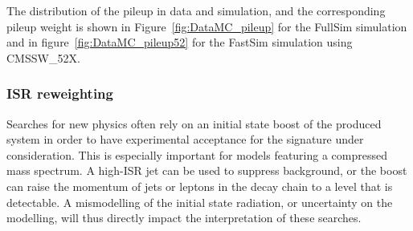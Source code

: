 The distribution of the pileup in data and simulation, and the corresponding pileup weight is
shown
in Figure~\ref{fig:DataMC_pileup} for the FullSim simulation and in
figure~\ref{fig:DataMC_pileup52}
for the FastSim simulation using CMSSW\_52X. 
% 
% 
% 
% 
% 


\subsubsection{ISR reweighting \label{sec:event_ISRreweighting}}

Searches for new physics often rely on an initial state boost of the produced system in order to
have experimental acceptance for the signature under consideration. This is especially important
for models featuring a compressed mass spectrum. A high-\pt ISR jet can be used to suppress
background, or the boost can raise the momentum of jets or leptons in the decay chain to a level
that is detectable.
A mismodelling of the initial state radiation, or uncertainty on the modelling, will thus
directly impact the interpretation of these searches. 

